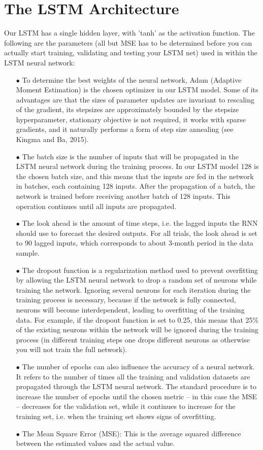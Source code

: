\documentclass[a4paper,11pt,oneside]{book}
\begin{document}
\section{The LSTM Architecture}
Our LSTM has a single hidden layer,  with 'tanh' as the activation function. The following are the parameters (all but MSE has to be determined before you can actually start training, validating and testing your LSTM net) used in within the LSTM neural network:
\begin{itemize}

\item[$\bullet$]   
To determine the best weights of the neural network, Adam (Adaptive Moment Estimation) is the chosen optimizer in our LSTM model. Some of its advantages are that the sizes of parameter updates are invariant to
rescaling of the gradient, its stepsizes are approximately bounded by the stepsize hyperparameter, stationary objective is not required, it works with sparse gradients, and it naturally performs a
form of step size annealing (see Kingma and Ba, 2015).
\item[$\bullet$] The batch size is the number of inputs that will be propagated in the
LSTM neural network during the training process. In our LSTM model 128 is the chosen batch size, and this means that the inputs are
fed in the network in batches, each containing 128 inputs. After
the propagation of a batch, the network is trained before receiving another
batch of 128 inputs. This operation continues until all inputs are propagated.
\item[$\bullet$] The look ahead is the amount of time steps, i.e. the lagged
inputs the RNN should use to forecast the desired outputs. For all trials, the look ahead is set to 90 lagged inputs, which
corresponds to about 3-month period in the data sample.
\item[$\bullet$] The dropout function is a regularization method used to prevent overfitting by
allowing the LSTM neural network to drop a random set of neurons while
training the network. Ignoring several neurons for each iteration during the
training process is necessary, because if the network is fully connected,
neurons will become interdependent, leading to overfitting of the training data. For example, if the dropout function is set to 0.25, this means that 25\% of the existing
neurons within the network will be ignored during the training process (in different training steps one drops different neurons as otherwise you will not train the full network).
\item[$\bullet$] The number of epochs can also influence the accuracy of a neural network. It
refers to the number of times all the training and validation datasets are
propagated through the LSTM neural network. The standard procedure is to
increase the number of epochs until the chosen metric – in this case the MSE
– decreases for the validation set, while it continues to increase for the training
set, i.e. when the training set shows signs of overfitting.
\item[$\bullet$] The Mean Square Error (MSE): This is the average squared difference between the estimated values and the actual value.
\end{itemize}
\end{document}
